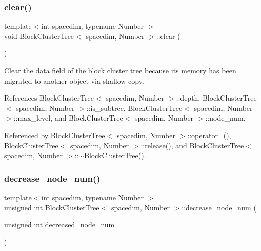 \mbox{\label{classBlockClusterTree_ab4227d666cd2872fbbfb4eec69e66313}} 
\subsubsection{\texorpdfstring{clear()}{clear()}}
{\footnotesize\ttfamily template$<$int spacedim, typename Number $>$ \\
void \hyperlink{classBlockClusterTree}{Block\+Cluster\+Tree}$<$ spacedim, Number $>$\+::clear (\begin{DoxyParamCaption}{ }\end{DoxyParamCaption})}

Clear the data field of the block cluster tree because its memory has been migrated to another object via shallow copy. 

References Block\+Cluster\+Tree$<$ spacedim, Number $>$\+::depth, Block\+Cluster\+Tree$<$ spacedim, Number $>$\+::is\+\_\+subtree, Block\+Cluster\+Tree$<$ spacedim, Number $>$\+::max\+\_\+level, and Block\+Cluster\+Tree$<$ spacedim, Number $>$\+::node\+\_\+num.



Referenced by Block\+Cluster\+Tree$<$ spacedim, Number $>$\+::operator=(), Block\+Cluster\+Tree$<$ spacedim, Number $>$\+::release(), and Block\+Cluster\+Tree$<$ spacedim, Number $>$\+::$\sim$\+Block\+Cluster\+Tree().

\mbox{\label{classBlockClusterTree_ae0e55e3ac56bffa31f251d4f07ae7e51}} 
\subsubsection{\texorpdfstring{decrease\+\_\+node\+\_\+num()}{decrease\_node\_num()}}
{\footnotesize\ttfamily template$<$int spacedim, typename Number $>$ \\
unsigned int \hyperlink{classBlockClusterTree}{Block\+Cluster\+Tree}$<$ spacedim, Number $>$\+::decrease\+\_\+node\+\_\+num (\begin{DoxyParamCaption}\item[{unsigned int}]{decreased\+\_\+node\+\_\+num = {} }\end{DoxyParamCaption})}


